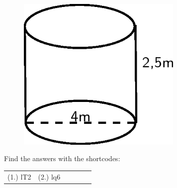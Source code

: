 \begin{enumerate}[noitemsep, label=\textbf{\arabic*}. ]
	\begin{figure}[H] %
    \begin{center}
    \label{m39357*id62926!!!underscore!!!media}\label{m39357*id62926!!!underscore!!!printimage}\includegraphics[width=300px]{col11306.imgs/m39357_MG10C14_004.png} %
        
      \vspace{2pt}
    \vspace{.1in}
    
    \end{center}

 \end{figure}   

    \addtocounter{footnote}{-0}
            \end{enumerate}
        
        

      
      \label{m39357*uid16}
\par {} Find the answers with the shortcodes:
 \par \begin{tabular}[h]{cccccc}
 (1.) lT2  &  (2.) lq6  & \end{tabular}



